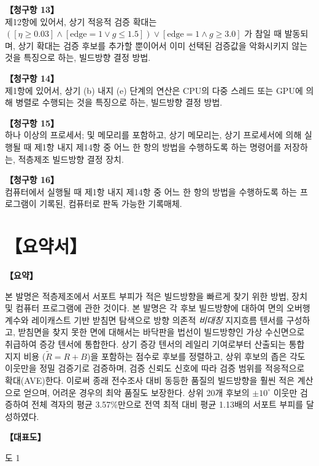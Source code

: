 \documentclass[11pt,a4paper]{article}
\newcommand{\hd}[1]{\medskip\noindent\textbf{【#1】}\par\nopagebreak}
\begin{document}
\medskip
\textbf{【청구항 13】}\\
제12항에 있어서, 상기 적응적 검증 확대는
$([\eta\ge0.03]\wedge[\mathrm{edge}=1\vee g\le1.5])\vee[\mathrm{edge}=1\wedge g\ge3.0]$
가 참일 때 발동되며, 상기 확대는 검증 후보를 추가할 뿐이어서 이미 선택된 검증값을
악화시키지 않는 것을 특징으로 하는, 빌드방향 결정 방법.

\medskip
\textbf{【청구항 14】}\\
제1항에 있어서, 상기 (b) 내지 (e) 단계의 연산은 CPU의 다중 스레드 또는 GPU에 의해
병렬로 수행되는 것을 특징으로 하는, 빌드방향 결정 방법.

\medskip
\textbf{【청구항 15】}\\
하나 이상의 프로세서; 및 메모리를 포함하고, 상기 메모리는, 상기 프로세서에 의해
실행될 때 제1항 내지 제14항 중 어느 한 항의 방법을 수행하도록 하는 명령어를 저장하는,
적층제조 빌드방향 결정 장치.

\medskip
\textbf{【청구항 16】}\\
컴퓨터에서 실행될 때 제1항 내지 제14항 중 어느 한 항의 방법을 수행하도록 하는
프로그램이 기록된, 컴퓨터로 판독 가능한 기록매체.

\newpage
\section*{【요약서】}

\hd{요약}
본 발명은 적층제조에서 서포트 부피가 적은 빌드방향을 빠르게 찾기 위한 방법, 장치 및
컴퓨터 프로그램에 관한 것이다. 본 발명은 각 후보 빌드방향에 대하여 면의 오버행 계수와
레이캐스트 기반 받침면 탐색으로 방향 의존적 \emph{비대칭} 지지흐름 텐서를 구성하고,
받침면을 찾지 못한 면에 대해서는 바닥판을 법선이 빌드방향인 가상 수신면으로 취급하여
증강 텐서에 통합한다. 상기 증강 텐서의 레일리 기여로부터 산출되는 통합 지지 비용
($\tilde R=R+B$)을 포함하는 점수로 후보를 정렬하고, 상위 후보의 좁은 각도 이웃만을
정밀 검증기로 검증하며, 검증 신뢰도 신호에 따라 검증 범위를 적응적으로 확대(AVE)한다.
이로써 종래 전수조사 대비 동등한 품질의 빌드방향을 훨씬 적은 계산으로 얻으며, 어려운
경우의 최악 품질도 보장한다. 상위 20개 후보의 $\pm10^\circ$ 이웃만 검증하여 전체
격자의 평균 3.57\%만으로 전역 최적 대비 평균 1.13배의 서포트 부피를 달성하였다.

\hd{대표도}
도 1
\end{document}
